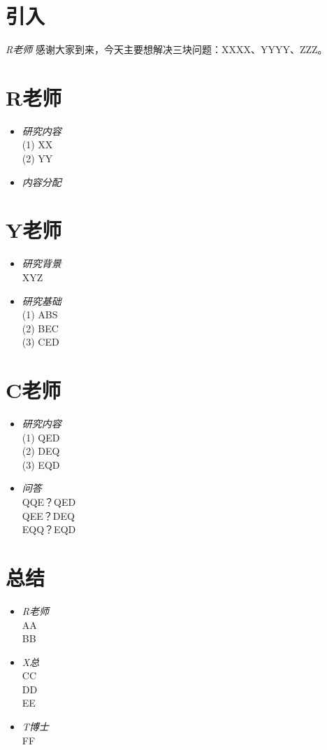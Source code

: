 \documentclass{meeting}
\begin{document}



\section{引入}
\textit{R老师} 感谢大家到来，今天主要想解决三块问题：XXXX、YYYY、ZZZ。

\section{R老师}
\begin{itemize}
\item \textit{研究内容}\\
  (1) XX \\
  (2) YY \\
\item \textit{内容分配}
\end{itemize}

\section{Y老师}
\begin{itemize}
\item \textit{研究背景}\\
  XYZ
\item \textit{研究基础}\\
(1) ABS \\
(2) BEC \\
(3) CED
\end{itemize}

\section{C老师}
\begin{itemize}
\item \textit{研究内容}\\
  (1) QED \\
  (2) DEQ \\
  (3) EQD
\item \textit{问答}\\
  QQE？QED \\
  QEE？DEQ \\
  EQQ？EQD
\end{itemize}

\section{总结}
\begin{itemize}
\item \textit{R老师}\\
  AA \\
  BB
\item \textit{X总}\\
  CC \\
  DD \\
  EE
\item \textit{T博士}\\
  FF
\end{itemize}
\end{document}
